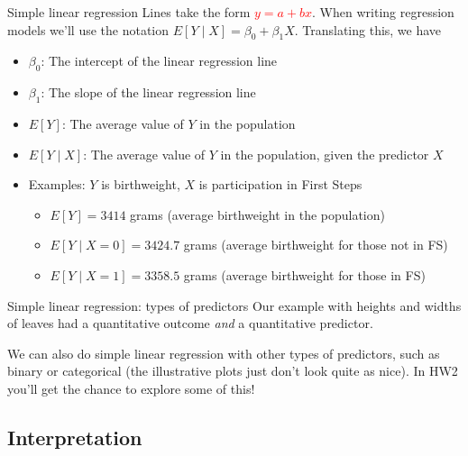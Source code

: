 \documentclass[10pt,t]{beamer}
\begin{document}
\begin{frame}{Simple linear regression}
Lines take the form \textcolor{red}{$y = a + bx$}. When writing regression models we'll use the notation $E[Y \mid X] = \beta_0 + \beta_1 X$. Translating this, we have

\vspace{0.3cm}

\begin{itemize}
	\item $\beta_0$: The intercept of the linear regression line
	\item $\beta_1$: The slope of the linear regression line
	\item $E[Y]$: The average value of $Y$ in the population
	\item $E[Y \mid X]$: The average value of $Y$ in the population, given the predictor $X$
	\item Examples: $Y$ is birthweight, $X$ is participation in First Steps
	\begin{itemize}
		\item $E[Y] = 3414$ grams (average birthweight in the population)
		\item $E[Y \mid X = 0] = 3424.7$ grams (average birthweight for those not in FS)
		\item $E[Y \mid X = 1] = 3358.5$ grams (average birthweight for those in FS)
	\end{itemize}
\end{itemize}
\end{frame}

\begin{frame}{Simple linear regression: types of predictors}
Our example with heights and widths of leaves had a quantitative outcome \textit{and} a quantitative predictor. 

\vspace{0.3cm}

We can also do simple linear regression with other types of predictors, such as binary or categorical (the illustrative plots just don't look quite as nice). In HW2 you'll get the chance to explore some of this!
\end{frame}

\subsection{Interpretation}
\end{document}

